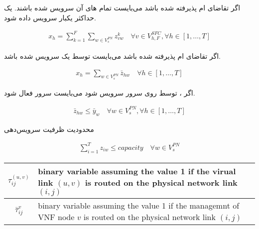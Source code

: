 اگر تقاضای ام پذیرفته شده باشد
می‌بایست تمام های آن‌
سرویس شده باشند.
یک  حداکثر یکبار سرویس داده شود.
\begin{latin}\begin{align}
    x_h = \sum_{k=1}^{F} \sum_{w \in V_{s}^{PN}} z_{vw}^{k}
    \quad
    \forall v \in V_{h,F}^{SFC}, \forall h \in [1,\ldots, T]
\end{align}\end{latin}

اگر تقاضای ام پذیرفته شده باشد
می‌بایست توسط یک  سرویس شده باشد.
\begin{latin}\begin{align}
    x_h = \sum_{w \in V_{s}^{PN}} \bar{z}_{hw}
    \quad
    \forall h \in [1,\ldots, T]
\end{align}\end{latin}

اگر ، 
توسط  روی سرور 
سرویس شود می‌بایست  سرور 
فعال شود.
\begin{latin}\begin{align}
    \bar{z}_{hw} \le \bar{y}_w
    \quad
    \forall w \in V_{s}^{PN}, \forall h \in [1,\ldots, T]
\end{align}\end{latin}

محدودیت ظرفیت سرویس‌دهی 
\begin{latin}\begin{align}
    \sum_{i=1}^{T} z_{iw} \le capacity
    \quad
    \forall w \in V_{s}^{PN}
\end{align}\end{latin}

\begin{center}\begin{latin}\begin{tabular}{|c|p{10cm}|}
    \hline
    $\tau^{(u,v)}_{ij}$ & binary variable assuming the value 1 if the virual link $(u,v)$ is routed on the physical network link $(i,j)$\\
    \hline
    $\bar{\tau}^{v}_{ij}$ & binary variable assuming the value 1 if the managemnt of VNF node $v$ is routed on the physical network link $(i,j)$\\
    \hline
\end{tabular}\end{latin}\end{center}

